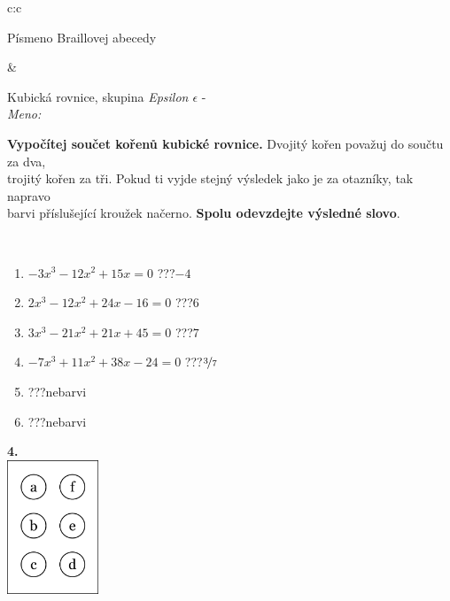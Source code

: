 \documentclass[10pt]{report}
\begin{document}
\begin{tabular}{c:c}
\begin{minipage}[c][104.5mm][t]{0.5\linewidth}
\begin{center}
\begin{minipage}{0.20\linewidth}
\begin{center}
{\small Písmeno Braillovej abecedy}
\end{center}
\end{minipage}
\end{center}
\end{minipage}
&
\begin{minipage}[c][104.5mm][t]{0.5\linewidth}
\begin{center}
\vspace{7mm}
{\huge Kubická rovnice, skupina \textit{Epsilon $\epsilon$} -}\\[5mm]
\textit{Meno:}\phantom{xxxxxxxxxxxxxxxxxxxxxxxxxxxxxxxxxxxxxxxxxxxxxxxxxxxxxxxxxxxxxxxxx}\\[5mm]
\begin{minipage}{0.95\linewidth}
\textbf{Vypočítej součet kořenů kubické rovnice.} Dvojitý kořen považuj do součtu za dva,\\trojitý kořen za tři. Pokud ti vyjde stejný výsledek jako je za otazníky, tak napravo\\barvi příslušející kroužek načerno. \textbf{Spolu odevzdejte výsledné slovo}.
\end{minipage}
\\[1mm]
\begin{minipage}{0.79\linewidth}
\begin{center}
\begin{varwidth}{\linewidth}
\begin{enumerate}
\Large
\item $-3x^3-12x^2+15x=0$\quad \dotfill\; ???\;\dotfill \quad $-4$
\item $2x^3-12x^2+24x-16=0$\quad \dotfill\; ???\;\dotfill \quad $6$
\item $3x^3-21x^2+21x+45=0$\quad \dotfill\; ???\;\dotfill \quad $7$
\item $-7x^3+11x^2+38x-24=0$\quad \dotfill\; ???\;\dotfill \quad $\nicefrac{3}{7}$
\item \quad \dotfill\; ???\;\dotfill \quad nebarvi
\item \quad \dotfill\; ???\;\dotfill \quad nebarvi
\end{enumerate}
\end{varwidth}
\end{center}
\end{minipage}
\begin{minipage}{0.20\linewidth}
\begin{center}
{\Huge\bfseries 4.} \\[2mm]
\includegraphics[height=40mm]{../images/braille.png}

\end{center}
\end{minipage}
\end{center}
\end{minipage}
\end{tabular}
\end{document}
